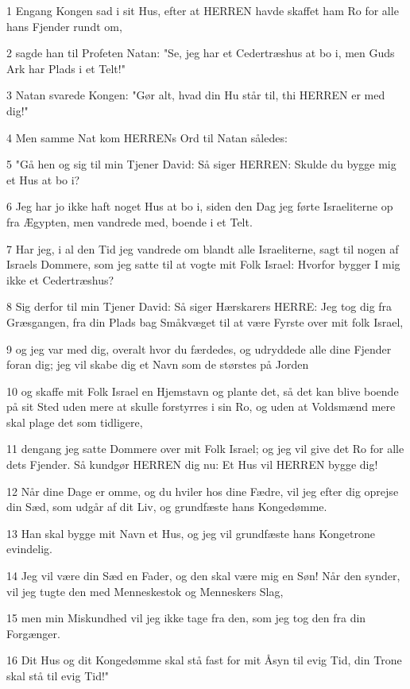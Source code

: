 \par 1 Engang Kongen sad i sit Hus, efter at HERREN havde skaffet ham Ro for alle hans Fjender rundt om,
\par 2 sagde han til Profeten Natan: "Se, jeg har et Cedertræshus at bo i, men Guds Ark har Plads i et Telt!"
\par 3 Natan svarede Kongen: "Gør alt, hvad din Hu står til, thi HERREN er med dig!"
\par 4 Men samme Nat kom HERRENs Ord til Natan således:
\par 5 "Gå hen og sig til min Tjener David: Så siger HERREN: Skulde du bygge mig et Hus at bo i?
\par 6 Jeg har jo ikke haft noget Hus at bo i, siden den Dag jeg førte Israeliterne op fra Ægypten, men vandrede med, boende i et Telt.
\par 7 Har jeg, i al den Tid jeg vandrede om blandt alle Israeliterne, sagt til nogen af Israels Dommere, som jeg satte til at vogte mit Folk Israel: Hvorfor bygger I mig ikke et Cedertræshus?
\par 8 Sig derfor til min Tjener David: Så siger Hærskarers HERRE: Jeg tog dig fra Græsgangen, fra din Plads bag Småkvæget til at være Fyrste over mit folk Israel,
\par 9 og jeg var med dig, overalt hvor du færdedes, og udryddede alle dine Fjender foran dig; jeg vil skabe dig et Navn som de størstes på Jorden
\par 10 og skaffe mit Folk Israel en Hjemstavn og plante det, så det kan blive boende på sit Sted uden mere at skulle forstyrres i sin Ro, og uden at Voldsmænd mere skal plage det som tidligere,
\par 11 dengang jeg satte Dommere over mit Folk Israel; og jeg vil give det Ro for alle dets Fjender. Så kundgør HERREN dig nu: Et Hus vil HERREN bygge dig!
\par 12 Når dine Dage er omme, og du hviler hos dine Fædre, vil jeg efter dig oprejse din Sæd, som udgår af dit Liv, og grundfæste hans Kongedømme.
\par 13 Han skal bygge mit Navn et Hus, og jeg vil grundfæste hans Kongetrone evindelig.
\par 14 Jeg vil være din Sæd en Fader, og den skal være mig en Søn! Når den synder, vil jeg tugte den med Menneskestok og Menneskers Slag,
\par 15 men min Miskundhed vil jeg ikke tage fra den, som jeg tog den fra din Forgænger.
\par 16 Dit Hus og dit Kongedømme skal stå fast for mit Åsyn til evig Tid, din Trone skal stå til evig Tid!"
